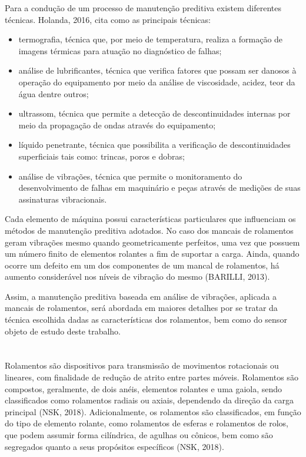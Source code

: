 \documentclass[
	12pt,				
	oneside,			
	a4paper,			
	english,			
	brazil,			
	]{abntex2ppgsi}
\begin{document}
Para a condução de um processo de manutenção preditiva existem diferentes técnicas. Holanda, 2016, cita como as principais técnicas: 
\begin{itemize}
	\item termografia, técnica que, por meio de temperatura, realiza a formação de imagens térmicas para atuação no diagnóstico de falhas; 
	\item análise de lubrificantes, técnica que verifica fatores que possam ser danosos à operação do equipamento por meio da análise de viscosidade, acidez, teor da água dentre outros; 
	\item ultrassom, técnica que permite a detecção de descontinuidades internas por meio da propagação de ondas através do equipamento; 
	\item líquido penetrante, técnica que possibilita a verificação de descontinuidades superficiais tais como: trincas, poros e dobras; 
	\item análise de vibrações, técnica que permite o monitoramento do desenvolvimento de falhas em maquinário e peças através de medições de suas assinaturas vibracionais. 
\end{itemize}

Cada elemento de máquina possui características particulares que influenciam os métodos de manutenção preditiva adotados. No caso dos mancais de rolamentos geram vibrações mesmo quando geometricamente perfeitos, uma vez que possuem um número finito de elementos rolantes a fim de suportar a carga. Ainda, quando ocorre um defeito em um dos componentes de um mancal de rolamentos, há aumento considerável nos níveis de vibração do mesmo (BARILLI, 2013).

Assim, a manutenção preditiva baseada em análise de vibrações, aplicada a mancais de rolamentos, será abordada em maiores detalhes por se tratar da técnica escolhida dadas as características dos rolamentos, bem como do sensor objeto de estudo deste trabalho.



\newpage
\section{}
Rolamentos são dispositivos para transmissão de movimentos rotacionais ou lineares, com finalidade de redução de atrito entre partes móveis. Rolamentos são compostos, geralmente, de dois anéis, elementos rolantes e uma gaiola, sendo classificados como rolamentos radiais ou axiais, dependendo da direção da carga principal (NSK, 2018). Adicionalmente, os rolamentos são classificados, em função do tipo de elemento rolante, como rolamentos de esferas e rolamentos de rolos, que podem assumir forma cilíndrica, de agulhas ou cônicos, bem como são segregados quanto a seus propósitos específicos (NSK, 2018).
\end{document}
